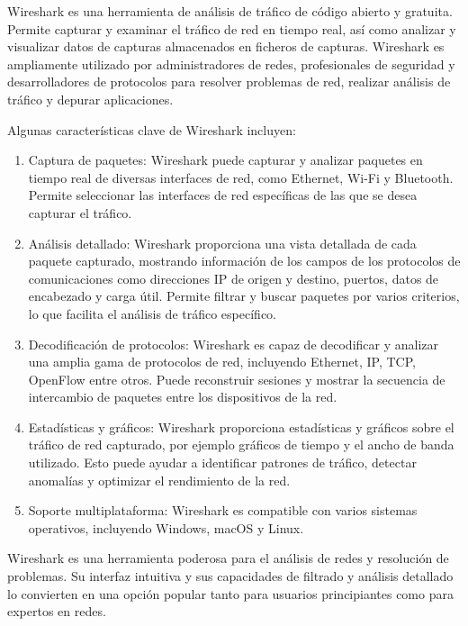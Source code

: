 \documentclass[a4paper, 12pt]{book}
\begin{document}
	Wireshark es una herramienta de análisis de tráfico de código abierto y gratuita. Permite capturar y examinar el tráfico de red en tiempo real, así como analizar y visualizar datos de capturas almacenados en ficheros de capturas. Wireshark es ampliamente utilizado por administradores de redes, profesionales de seguridad y desarrolladores de protocolos para resolver problemas de red, realizar análisis de tráfico y depurar aplicaciones.
	
	Algunas características clave de Wireshark incluyen:
	
	\begin{enumerate}
		\item 	Captura de paquetes: Wireshark puede capturar y analizar paquetes en tiempo real de diversas interfaces de red, como Ethernet, Wi-Fi y Bluetooth. Permite seleccionar las interfaces de red específicas de las que se desea capturar el tráfico.	
		\item 	Análisis detallado: Wireshark proporciona una vista detallada de cada paquete capturado, mostrando información de los campos de los protocolos de comunicaciones como direcciones IP de origen y destino, puertos, datos de encabezado y carga útil. Permite filtrar y buscar paquetes por varios criterios, lo que facilita el análisis de tráfico específico.
		\item 	Decodificación de protocolos: Wireshark es capaz de decodificar y analizar una amplia gama de protocolos de red, incluyendo Ethernet, IP, TCP, OpenFlow entre otros. Puede reconstruir sesiones y mostrar la secuencia de intercambio de paquetes entre los dispositivos de la red.
		\item 	Estadísticas y gráficos: Wireshark proporciona estadísticas y gráficos sobre el tráfico de red capturado, por ejemplo gráficos de tiempo y el ancho de banda utilizado. Esto puede ayudar a identificar patrones de tráfico, detectar anomalías y optimizar el rendimiento de la red.
		\item   Soporte multiplataforma: Wireshark es compatible con varios sistemas operativos, incluyendo Windows, macOS y Linux. 
	\end{enumerate}
	
	
	Wireshark es una herramienta poderosa para el análisis de redes y resolución de problemas. Su interfaz intuitiva y sus capacidades de filtrado y análisis detallado lo convierten en una opción popular tanto para usuarios principiantes como para expertos en redes.
		
	
	
\end{document}
